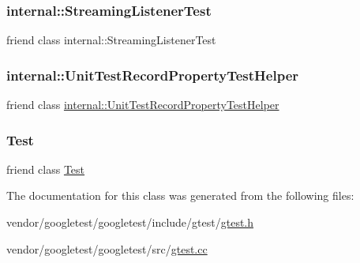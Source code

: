 \subsubsection{\texorpdfstring{internal\+::\+Streaming\+Listener\+Test}{internal::StreamingListenerTest}}
{\footnotesize\ttfamily friend class internal\+::\+Streaming\+Listener\+Test\hspace{0.3cm}{\ttfamily [friend]}}

\mbox{\label{classtesting_1_1_unit_test_ae970f89a9f477a349fe5778be85ef42e}} 
\subsubsection{\texorpdfstring{internal\+::\+Unit\+Test\+Record\+Property\+Test\+Helper}{internal::UnitTestRecordPropertyTestHelper}}
{\footnotesize\ttfamily friend class \hyperlink{classtesting_1_1internal_1_1_unit_test_record_property_test_helper}{internal\+::\+Unit\+Test\+Record\+Property\+Test\+Helper}\hspace{0.3cm}{\ttfamily [friend]}}

\mbox{\label{classtesting_1_1_unit_test_a5b78b1c2e1fa07ffed92da365593eaa4}} 
\subsubsection{\texorpdfstring{Test}{Test}}
{\footnotesize\ttfamily friend class \hyperlink{classtesting_1_1_test}{Test}\hspace{0.3cm}{\ttfamily [friend]}}



The documentation for this class was generated from the following files\+:\begin{DoxyCompactItemize}
\item 
vendor/googletest/googletest/include/gtest/\hyperlink{gtest_8h}{gtest.\+h}\item 
vendor/googletest/googletest/src/\hyperlink{gtest_8cc}{gtest.\+cc}\end{DoxyCompactItemize}
